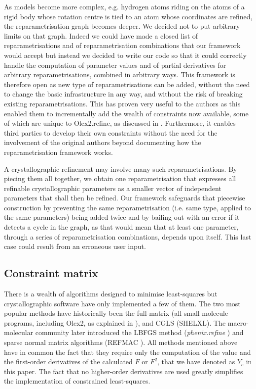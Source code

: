 \documentclass[pdf]{iucr}
\begin{document}
As models become more complex, e.g. hydrogen atoms riding on the atoms of a rigid body whose rotation centre is tied to an atom whose coordinates are refined, the reparametrisation graph becomes deeper. We decided not to put arbitrary limits on that graph. Indeed we could have made a closed list of reparametrisations and of reparametrisation combinations  that our framework would accept but instead we decided to write our code so that it could correctly handle the computation of parameter values and of partial derivatives for arbitrary reparametrisations, combined in arbitrary ways. This framework is therefore open as new type of reparametrisations can be added, without the need to change the basic infrastructure in any way, and without the risk of breaking existing reparametrisations. This has proven very useful to the authors as this enabled them to incrementally add the wealth of constraints now available, some of which are unique to Olex2.refine, as discussed in . Furthermore, it enables third parties to develop their own constraints without the need for the involvement of the original authors beyond documenting how the reparametrisation framework works.

A crystallographic refinement may involve many such reparametrisations. By piecing them all together, we obtain one reparametrisation that expresses all refinable crystallographic parameters as a smaller vector of independent parameters that shall then be refined. Our framework safeguards that piecewise construction by preventing the same reparametrisation (i.e. same type, applied to the same parameters) being added twice and by bailing out with an error if it detects a cycle in the graph, as that would mean that at least one parameter, through a series of reparametrisation combinations, depends upon itself. This last case could  result from an erroneous user input.

\subsection{Constraint matrix}

There is a wealth of algorithms designed to minimise least-squares but crystallographic software have only implemented a few of them. The two most popular methods have historically been the full-matrix (all small molecule programs, including Olex2, as explained in ), and CGLS (SHELXL).  The macro-molecular community later introduced the LBFGS method (\emph{phenix.refine} \cite{Afonine:2012aa}) and sparse normal matrix algorithms (REFMAC \cite{Murshudov:1999aa}). All methods mentioned above have in common the fact that they require only the computation of the value and the first-order derivatives of the calculated $F$ or $F^2$, that we have denoted as $Y_c$ in this paper. The fact that no higher-order derivatives are used greatly simplifies the implementation of constrained least-squares.
\end{document}
